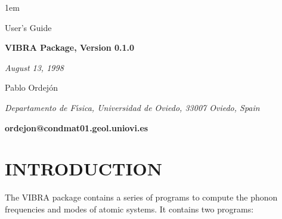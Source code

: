 %



\textheight 22cm
\textwidth 16cm
\oddsidemargin 1mm
\topmargin -15mm

\baselineskip=14pt
\parskip 5pt
\parindent 1em




\begin{titlepage}

\begin{center}

\vspace{1cm}

{\huge {\sc User's Guide}}

\vspace{3cm}

{\Huge {\bf VIBRA Package, Version 0.1.0}}

\vspace{3cm}

{\Large {\it August 13, 1998}}

\vspace{3cm}

{\Large Pablo Ordej\'on}

\vspace{5pt}

{\it Departamento de F\'{\i}sica, Universidad de
Oviedo, 33007 Oviedo, Spain}

\vspace{5pt}

{\bf ordejon@condmat01.geol.uniovi.es}

\end{center}

\end{titlepage}


%



\section{INTRODUCTION}

\noindent
The VIBRA package contains a series of programs to compute the
phonon frequencies and modes of atomic systems. It contains two 
programs:

